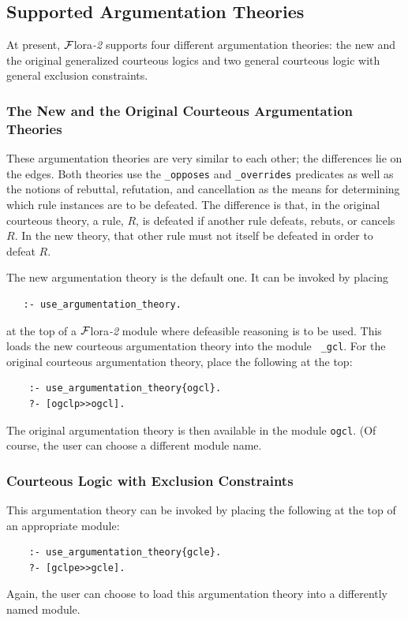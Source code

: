 \documentclass[11pt]{article}
\newcommand{\FLORA}{{\mbox{\sc ${\cal F}${lora}\rm\emph{-2}}}\xspace}
\begin{document}
\subsection{Supported Argumentation Theories}\label{sec-exclusion-constr}

At present, \FLORA supports four different argumentation theories: the new
and the original generalized courteous logics and two general courteous
logic with general exclusion constraints.

\subsubsection{The New and the Original Courteous Argumentation Theories}

These argumentation theories are very similar to each other; the
differences lie on the edges. Both theories use the {\tt \_opposes} and
{\tt \_overrides} predicates as well as the notions of rebuttal,
refutation, and cancellation as the means for determining which rule
instances are to be defeated. The difference is that, in the original courteous
theory, a rule, $R$, is defeated if another rule defeats, rebuts, or
cancels $R$.
In the new theory, that other rule must not itself be defeated in order to
defeat $R$.

The new argumentation theory is the default one. It can be invoked by placing
\begin{verbatim}
   :- use_argumentation_theory.
\end{verbatim}
at the top of a \FLORA module where defeasible reasoning is to be used.
This loads the new courteous argumentation theory into the module {\tt
  \_gcl}. For the original courteous argumentation theory, place the
following at the top:
\begin{verbatim}
    :- use_argumentation_theory{ogcl}.
    ?- [ogclp>>ogcl].
\end{verbatim}
The original argumentation theory is then available in the module {\tt ogcl}.
(Of course, the user can choose a different module name.

\subsubsection{Courteous Logic with Exclusion Constraints}

This argumentation theory can be invoked by placing the following at the
top of an appropriate module:
\begin{verbatim}
    :- use_argumentation_theory{gcle}.
    ?- [gclpe>>gcle].
\end{verbatim}
Again, the user can choose to load this argumentation theory into a
differently named module.
\end{document}
